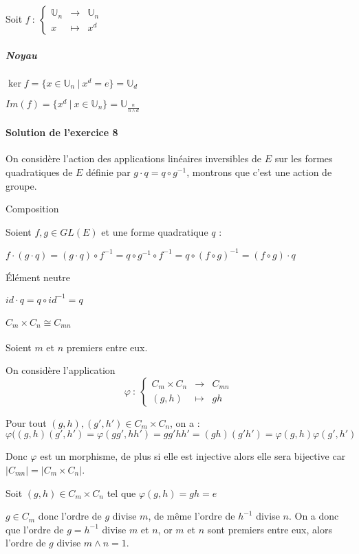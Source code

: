 \documentclass[]{article}
\theoremstyle{remark}
\theoremstyle{definition}
\newcommand{\func}[5]{
#1 ~ : ~ \left\{ \begin{array}{lcl}
	#2 & \longrightarrow & #3 \\
	#4 & \longmapsto & #5
\end{array}
\right.
}
\newenvironment{proofpart}[1]{
	\noindent
	{\boldmath #1}
}{
	\checkmark
}
\begin{document}
Soit $\func{f}{\mathbb{U}_n}{\mathbb{U}_n}{x}{x^d}$

\subparagraph{Noyau}

$\ker f = \{x \in \mathbb{U}_n ~ | ~ x^d = e \} = \mathbb{U}_d$

$Im(f)=\{x^d ~|~ x \in \mathbb{U}_n\}=\mathbb{U}_{\frac{n}{n \land d}}$

\paragraph{Solution de l'exercice 8}

On considère l'action des applications linéaires inversibles de $E$ sur les formes quadratiques de $E$ définie par $g \cdot q = q \circ g^{-1}$, montrons que c'est une action de groupe.

\begin{proofpart}{Composition}

	Soient $f, g \in GL(E)$ et une forme quadratique $q$ :
	
	$f\cdot(g \cdot q)=(g \cdot q) \circ f^{-1}=q\circ g^{-1}\circ f^{-1}=q \circ (f \circ g)^{-1}=(f \circ g) \cdot q$
\end{proofpart}

\begin{proofpart}{Élément neutre}

	$id \cdot q = q \circ id^{-1} = q$
\end{proofpart}

\paragraph{\boldmath $C_m \times C_n \cong C_{mn}$} Soient $m$ et $n$ premiers entre eux.

On considère l'application
$$\func{\varphi}{C_m \times C_n}{C_{mn}}{(g,h)}{gh}$$

Pour tout $(g, h), (g', h') \in C_m \times C_n$, on a :  $$\varphi((g,h)(g',h')=\varphi(gg',hh')=gg'hh'=(gh)(g'h')=\varphi(g,h)\varphi(g',h')$$

Donc $\varphi$ est un morphisme, de plus si elle est injective alors elle sera bijective car $|C_{mn}| = |C_m \times C_n|$.

Soit $(g,h) \in C_m \times C_n$ tel que $\varphi(g, h) = gh = e$

$g \in C_m$ donc l'ordre de $g$ divise $m$, de même l'ordre de $h^{-1}$ divise $n$. On a donc que l'ordre de $g=h^{-1}$ divise $m$ et $n$, or $m$ et $n$ sont premiers entre eux, alors l'ordre de $g$ divise $m \land n = 1$.
\end{document}
